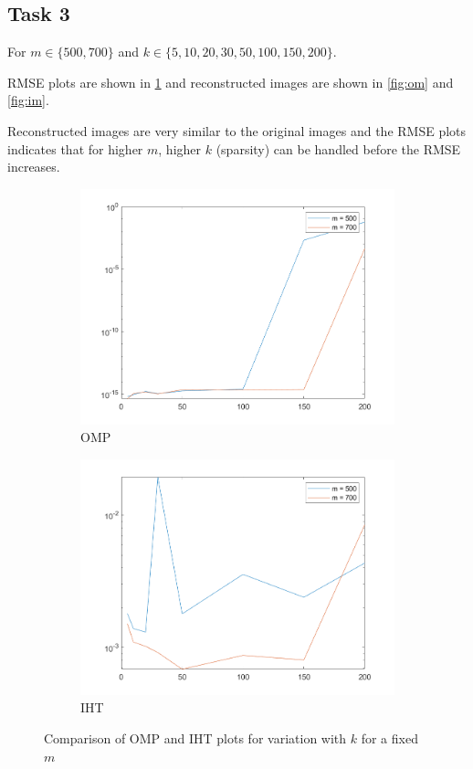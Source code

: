 \documentclass[a4paper, landscape]{article}
\begin{document}
\subsection{Task 3}
For $m \in \{500,700\}$ and $k \in \{5,10,20,30,50,100,150,200\}$.

RMSE plots are shown in \ref{fig:cm} and reconstructed images are shown in \ref{fig:om} and \ref{fig:im}.

Reconstructed images are very similar to the original images and the RMSE plots indicates that for higher $m$, higher $k$ (sparsity) can be handled before the RMSE increases.
\begin{figure}[H]
    \centering
    \begin{subfigure}{0.45\linewidth}
        \centering
        \includegraphics[width=\linewidth]{omp/plot m.png}
        \caption{OMP}
    \end{subfigure}
    \begin{subfigure}{0.45\linewidth}
        \centering
        \includegraphics[width=\linewidth]{iht/plot m.png}
        \caption{IHT}
    \end{subfigure}
    \caption{Comparison of OMP and IHT plots for variation with $k$ for a fixed $m$}
    \label{fig:cm}
\end{figure}
\end{document}
